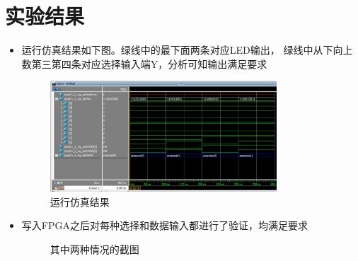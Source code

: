 \documentclass[12pt,a4paper,UTF8]{article}
\begin{document}
\section{实验结果}
\begin{itemize}
  \item 运行仿真结果如下图。绿线中的最下面两条对应LED输出，
        绿线中从下向上数第三第四条对应选择输入端Y，分析可知输出满足要求
        \begin{figure}[H]
          \centering
          \includegraphics[width=0.8\textwidth]{mux_sim.JPG}
          \caption{运行仿真结果}
          \label{mux_sim}
        \end{figure}
  \item 写入FPGA之后对每种选择和数据输入都进行了验证，均满足要求
        \begin{figure}[H]
          \centering
          \caption{其中两种情况的截图}
          \label{fpga}
        \end{figure}
\end{itemize}
\end{document}
